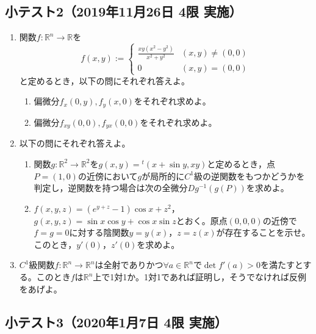 \documentclass[dvipdfmx,a4j,10pt]{jsarticle}
\theoremstyle{mystyle1}
\theoremstyle{mystyle2}
\begin{document}
\subsection{小テスト2（2019年11月26日 4限 実施）}

\begin{enumerate}
    \item 関数$f:\mathbb{R}^n\to\mathbb{R}$を
        \[
        f(x,y):=
        \begin{cases}
            \displaystyle\frac{xy(x^2-y^2)}{x^2+y^2} & (x,y)\neq(0,0) \\
            0 & (x,y)=(0,0)
        \end{cases}
        \]
        と定めるとき，以下の問にそれぞれ答えよ。
        \begin{enumerate}\renewcommand{\labelenumii}{(\arabic{enumii})}
            \item 偏微分$f_x(0,y),f_y(x,0)$をそれぞれ求めよ。
            \item 偏微分$f_{xy}(0,0),f_{yx}(0,0)$をそれぞれ求めよ。
        \end{enumerate}
    \item 以下の問にそれぞれ答えよ。
        \begin{enumerate}\renewcommand{\labelenumii}{(\arabic{enumii})}
            \item 関数$g:\mathbb{R}^2\to\mathbb{R}^2$を$g(x,y)={}^t(x+\sin y,xy)$と定めるとき，点$P=(1,0)$の近傍において$g$が局所的に$C^1$級の逆関数をもつかどうかを判定し，逆関数を持つ場合は次の全微分$Dg^{-1}(g(P))$を求めよ。
            \item $f(x,y,z)=(e^{y+z}-1)\cos x+z^2$，$g(x,y,z)=\sin x\cos y+\cos x\sin z$とおく。原点$(0,0,0)$の近傍で$f=g=0$に対する陰関数$y=y(x)$，$z=z(x)$が存在することを示せ。このとき，$y'(0)$，$z'(0)$を求めよ。
        \end{enumerate}
    \item $C^1$級関数$f:\mathbb{R}^n\to\mathbb{R}^n$は全射でありかつ$\forall a\in\mathbb{R}^n$で$\det f'(a)>0$を満たすとする。このとき$f$は$\mathbb{R}^n$上で1対1か。1対1であれば証明し，そうでなければ反例をあげよ。
\end{enumerate}

\subsection{小テスト3（2020年1月7日 4限 実施）}
\end{document}
